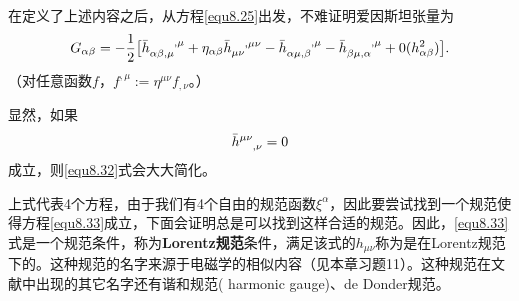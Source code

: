 在定义了上述内容之后，从方程\eqref{equ8.25}出发，不难证明爱因斯坦张量为
\begin{equation}
\begin{split}
    G_{\alpha \beta} = -\frac{1}{2} \big[ \bar{h}\indices{_{\alpha \beta, \mu}^{, \mu}} + \eta_{\alpha \beta} \bar{h}\indices{_{\mu \nu}^{, \mu \nu}} - \bar{h}\indices{_{\alpha \mu, \beta}^{, \mu}} - \bar{h}\indices{_{\beta \mu, \alpha}^{, \mu}} + 0(h_{\alpha \beta}^2) \big]. 
\end{split}
\label{equ8.32}
\end{equation}
（对任意函数$f$，$f^{, \mu} := \eta^{\mu \nu} f_{, \nu}$。）

显然，如果
\begin{equation}
    \bar{h}\indices{^{\mu \nu}_{, \nu}} = 0 \label{equ8.33}
\end{equation}
成立，则\eqref{equ8.32}式会大大简化。

上式代表4个方程，由于我们有4个自由的规范函数$\xi^\alpha$，因此要尝试找到一个规范使得方程\eqref{equ8.33}成立，下面会证明总是可以找到这样合适的规范。因此，\eqref{equ8.33}式是一个规范条件，称为\textbf{Lorentz规范}条件，满足该式的$h_{\mu \nu}$称为是在Lorentz规范下的。这种规范的名字来源于电磁学的相似内容（见本章习题11）。这种规范在文献中出现的其它名字还有谐和规范( harmonic gauge)、de Donder规范。

